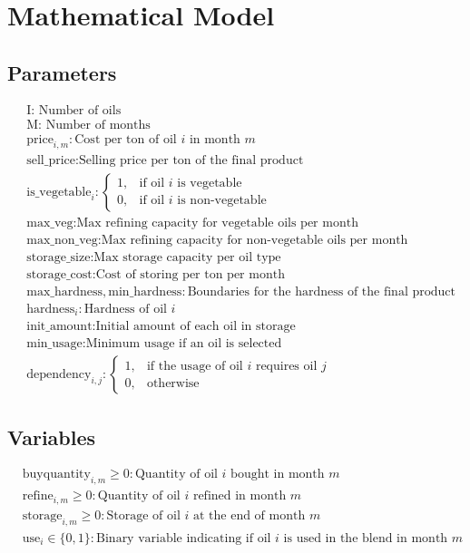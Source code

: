 \documentclass{article}
\begin{document}
\section*{Mathematical Model}

\subsection*{Parameters}
\begin{align*}
    & \text{I: Number of oils} \\
    & \text{M: Number of months} \\
    & \text{price}_{i,m}: \text{Cost per ton of oil } i \text{ in month } m \\
    & \text{sell\_price}: \text{Selling price per ton of the final product} \\
    & \text{is\_vegetable}_i: \begin{cases} 
        1, & \text{if oil } i \text{ is vegetable} \\
        0, & \text{if oil } i \text{ is non-vegetable} 
    \end{cases} \\
    & \text{max\_veg}: \text{Max refining capacity for vegetable oils per month} \\
    & \text{max\_non\_veg}: \text{Max refining capacity for non-vegetable oils per month} \\
    & \text{storage\_size}: \text{Max storage capacity per oil type} \\
    & \text{storage\_cost}: \text{Cost of storing per ton per month} \\
    & \text{max\_hardness}, \text{min\_hardness}: \text{Boundaries for the hardness of the final product} \\
    & \text{hardness}_i: \text{Hardness of oil } i \\
    & \text{init\_amount}: \text{Initial amount of each oil in storage} \\
    & \text{min\_usage}: \text{Minimum usage if an oil is selected} \\
    & \text{dependency}_{i,j}: \begin{cases} 
        1, & \text{if the usage of oil } i \text{ requires oil } j \\
        0, & \text{otherwise} 
    \end{cases}
\end{align*}

\subsection*{Variables}
\begin{align*}
    & \text{buyquantity}_{i,m} \geq 0: \text{Quantity of oil } i \text{ bought in month } m \\
    & \text{refine}_{i,m} \geq 0: \text{Quantity of oil } i \text{ refined in month } m \\
    & \text{storage}_{i,m} \geq 0: \text{Storage of oil } i \text{ at the end of month } m \\
    & \text{use}_i \in \{0, 1\}: \text{Binary variable indicating if oil } i \text{ is used in the blend in month } m
\end{align*}
\end{document}
